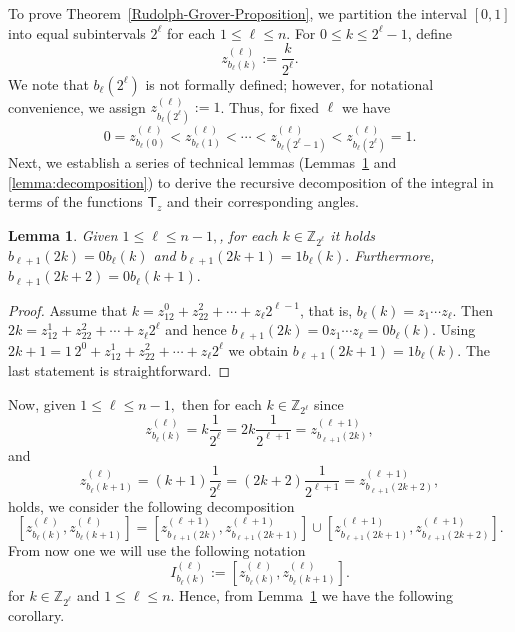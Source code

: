 \documentclass[a4paper,11pt]{article}
\newtheorem{lemma}[theorem]{Lemma}
\newcommand{\rT}{\mathsf{T}}
\begin{document}
  To prove Theorem~\ref{Rudolph-Grover-Proposition}, we partition the interval \([0,1]\) into equal subintervals \(2^\ell\) for each \(1\le \ell\le n\). For \(0\le k\le 2^\ell-1\), define
  \[
  z_{b_\ell(k)}^{(\ell)}:=\frac{k}{2^\ell}.
  \]
  We note that \( b_{\ell}(2^{\ell}) \) is not formally defined; however, for notational convenience, we assign \( z_{b_{\ell}(2^{\ell})}^{(\ell)} := 1 \).
  Thus, for fixed \(\ell\) we have
  \[
  0=z_{b_\ell(0)}^{(\ell)} < z_{b_\ell(1)}^{(\ell)} < \cdots < z_{b_\ell(2^\ell-1)}^{(\ell)} < z_{b_\ell(2^\ell)}^{(\ell)}=1.
  \]
  Next, we establish a series of technical lemmas (Lemmas~\ref{lema1} and \ref{lemma:decomposition}) to derive the recursive decomposition of the integral in terms of the functions $\rT_z$ and their corresponding angles.

  \begin{lemma}\label{lema1}
  Given $1 \le \ell \le n-1,$, for each $k \in \mathbb{Z}_{2^{\ell}}$ it holds $b_{\ell+1}(2k) = 0b_{\ell}(k)$ and $b_{\ell+1}(2k+1) = 1b_{\ell}(k).$ Furthermore,
  $b_{\ell+1}(2k+2) = 0b_{\ell}(k+1).$
  \end{lemma}

  \begin{proof}
    Assume that $k = z_12^0+z_22^2+\cdots+z_{\ell}2^{\ell-1}$, that is, $b_{\ell}(k)=z_1\cdots z_{\ell}.$ Then $2k =  z_12^1+z_22^2+\cdots+z_{\ell}2^{\ell}$ and hence
$b_{\ell+1}(2k) = 0z_1\cdots z_{\ell} = 0b_{\ell}(k).$ Using $2k +1 = 1\, 2^0+z_12^1+z_22^2+\cdots+z_{\ell}2^{\ell}$ we obtain  $b_{\ell+1}(2k+1) = 1b_{\ell}(k).$
    The last statement is straightforward.
    \end{proof}

  \bigskip

  Now,  given $1 \le \ell \le n-1,$ then for each $k \in \mathbb{Z}_{2^{\ell}}$ since
  $$
  z_{b_{\ell}(k)}^{(\ell)} = k \frac{1}{2^{\ell}} =  2k \frac{1}{2^{\ell+1}} =  z_{b_{\ell+1}(2k)}^{(\ell+1)},
  $$
  and
  $$
  z_{b_{\ell}(k+1)}^{(\ell)} = (k+1) \frac{1}{2^{\ell}} =  (2k+2) \frac{1}{2^{\ell+1}} =  z_{b_{\ell+1}(2k+2)}^{(\ell+1)},
  $$
  holds, we consider the following decomposition
  $$
  [z_{b_{\ell}(k)}^{(\ell)},z_{b_{\ell}(k+1)}^{(\ell)}] = [z_{b_{\ell+1}(2k)}^{(\ell+1)},z_{b_{\ell+1}(2k+1)}^{(\ell+1)}] \cup  [z_{b_{\ell+1}(2k+1)}^{(\ell+1)},z_{b_{\ell+1}(2k+2)}^{(\ell+1)}].
  $$
  From now one we will use the following notation
  $$
  I_{b_{\ell}(k)}^{(\ell)} := [z_{b_{\ell}(k)}^{(\ell)},z_{b_{\ell}(k+1)}^{(\ell)}].
  $$
  for $k \in \mathbb{Z}_{2^{\ell}}$ and $1 \le \ell \le n.$ Hence, from Lemma~\ref{lema1} we have the following corollary.
  
\end{document}
